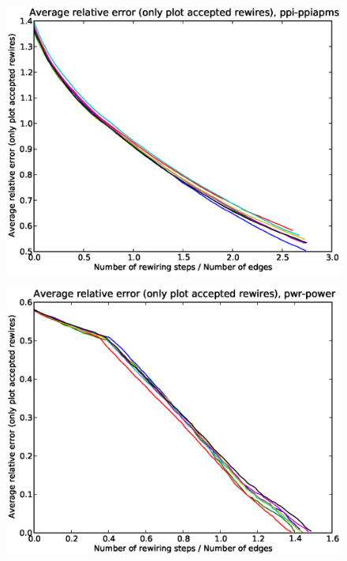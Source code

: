 \documentclass[12pt]{article}
\begin{document}
\begin{figure}[p]
\includegraphics[scale=0.75]{acceptedOnly-ppi-ppiapms.eps}\\
\end{figure}


\begin{figure}[p]
\includegraphics[scale=0.75]{acceptedOnly-pwr-power.eps}\\
\end{figure}
\end{document}
